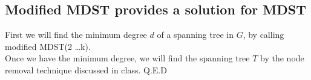 \documentclass[12pt,twocolumn]{article}
\begin{document}
\subsection{Modified MDST provides a solution for MDST}
First we will find the minimum degree $d$ of a spanning tree in $G$, by calling modified MDST(2 \dots k).\\
Once we have the minimum degree, we will find the spanning tree $T$ by the node removal technique discussed in class.
Q.E.D
\end{document}
